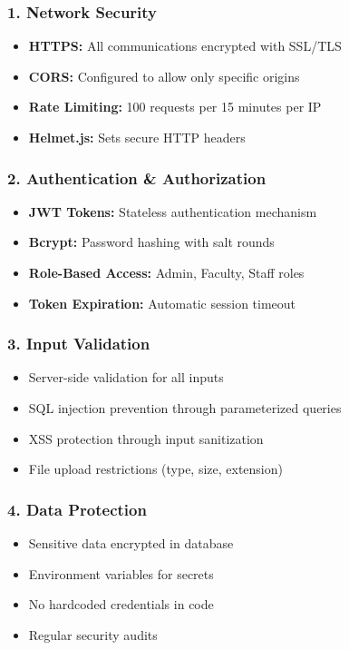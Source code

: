 \documentclass[12pt,a4paper]{report}
\begin{document}
\subsubsection*{1. Network Security}
\begin{itemize}
    \item \textbf{HTTPS:} All communications encrypted with SSL/TLS
    \item \textbf{CORS:} Configured to allow only specific origins
    \item \textbf{Rate Limiting:} 100 requests per 15 minutes per IP
    \item \textbf{Helmet.js:} Sets secure HTTP headers
\end{itemize}

\subsubsection*{2. Authentication \& Authorization}
\begin{itemize}
    \item \textbf{JWT Tokens:} Stateless authentication mechanism
    \item \textbf{Bcrypt:} Password hashing with salt rounds
    \item \textbf{Role-Based Access:} Admin, Faculty, Staff roles
    \item \textbf{Token Expiration:} Automatic session timeout
\end{itemize}

\subsubsection*{3. Input Validation}
\begin{itemize}
    \item Server-side validation for all inputs
    \item SQL injection prevention through parameterized queries
    \item XSS protection through input sanitization
    \item File upload restrictions (type, size, extension)
\end{itemize}

\subsubsection*{4. Data Protection}
\begin{itemize}
    \item Sensitive data encrypted in database
    \item Environment variables for secrets
    \item No hardcoded credentials in code
    \item Regular security audits
\end{itemize}
\end{document}
